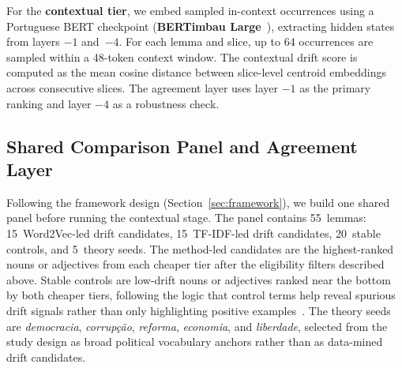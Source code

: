 \documentclass[12pt]{article}
\begin{document}

For the \textbf{contextual tier}, we embed sampled in-context occurrences using a Portuguese BERT checkpoint (\textbf{BERTimbau Large}~\cite{souza-etal-2020-bertimbau}), extracting hidden states from layers $-1$ and~$-4$. For each lemma and slice, up to 64 occurrences are sampled within a 48-token context window. The contextual drift score is computed as the mean cosine distance between slice-level centroid embeddings across consecutive slices. The agreement layer uses layer $-1$ as the primary ranking and layer $-4$ as a robustness check.

\subsection{Shared Comparison Panel and Agreement Layer}

Following the framework design (Section~\ref{sec:framework}), we build one shared panel before running the contextual stage. The panel contains 55~lemmas: 15~Word2Vec-led drift candidates, 15~TF-IDF-led drift candidates, 20~stable controls, and 5~theory seeds. The method-led candidates are the highest-ranked nouns or adjectives from each cheaper tier after the eligibility filters described above. Stable controls are low-drift nouns or adjectives ranked near the bottom by both cheaper tiers, following the logic that control terms help reveal spurious drift signals rather than only highlighting positive examples~\cite{dubossarsky-etal-2017-outta}. The theory seeds are \textit{democracia}, \textit{corrup\c{c}\~ao}, \textit{reforma}, \textit{economia}, and \textit{liberdade}, selected from the study design as broad political vocabulary anchors rather than as data-mined drift candidates.
\end{document}
